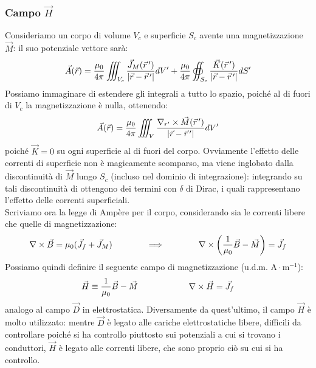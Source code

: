 \subsubsection{Campo $ \vec{H} $}

Consideriamo un corpo di volume $ V_c $ e superficie $ S_c $ avente una magnetizzazione $ \vec{M} $: il suo potenziale vettore sarà:
\begin{equation}
	\vec{A}(\vec{r}) = \frac{\mu_0}{4\pi} \iiint_{V_c} \frac{\vec{J}_M(\vec{r}\,')}{\left\lvert\vec{r}-\vec{r}\,'\right\rvert} dV' + \frac{\mu_0}{4\pi} \oiint_{S_c} \frac{\vec{K}(\vec{r}\,')}{\left\lvert\vec{r}-\vec{r}\,'\right\rvert} dS'
	\label{eq:20}
\end{equation}
Possiamo immaginare di estendere gli integrali a tutto lo spazio, poiché al di fuori di $ V_c $ la magnetizzazione è nulla, ottenendo:
\begin{equation}
	\vec{A}(\vec{r}) = \frac{\mu_0}{4\pi} \iiint_V \frac{\nabla_{r'}\times\vec{M}(\vec{r}\,')}{\left\lvert\vec{r}-\vec{r}\,'\right\rvert}dV'
	\label{eq:21}
\end{equation}
poiché $ \vec{K} = 0 $ su ogni superficie al di fuori del corpo. Ovviamente l'effetto delle correnti di superficie non è magicamente scomparso, ma viene inglobato dalla discontinuità di $ \vec{M} $ lungo $ S_c $ (incluso nel dominio di integrazione): integrando su tali discontinuità di ottengono dei termini con $ \delta $ di Dirac, i quali rappresentano l'effetto delle correnti superficiali. \\ 
%
Scriviamo ora la legge di Ampère per il corpo, considerando sia le correnti libere che quelle di magnetizzazione:
\begin{equation}
	\nabla\times\vec{B} = \mu_0 (\vec{J}_f + \vec{J}_M) \qquad\qquad\Longrightarrow\qquad\qquad \nabla\times\left(\frac{1}{\mu_0}\vec{B} - \vec{M}\right) = \vec{J}_f
	\label{eq:22}
\end{equation}
Possiamo quindi definire il seguente campo di magnetizzazione (u.d.m. $ \text{A}\cdot\text{m}^{-1} $):
\begin{equation}
	\vec{H} \equiv \frac{1}{\mu_0} \vec{B} - \vec{M} \qquad\qquad\qquad \nabla\times\vec{H} = \vec{J}_f
	\label{eq:23}
\end{equation}
analogo al campo $ \vec{D} $ in elettrostatica. Diversamente da quest'ultimo, il campo $ \vec{H} $ è molto utilizzato: mentre $ \vec{D} $ è legato alle cariche elettrostatiche libere, difficili da controllare poiché si ha controllo piuttosto sui potenziali a cui si trovano i conduttori, $ \vec{H} $ è legato alle correnti libere, che sono proprio ciò su cui si ha controllo. \\ 
